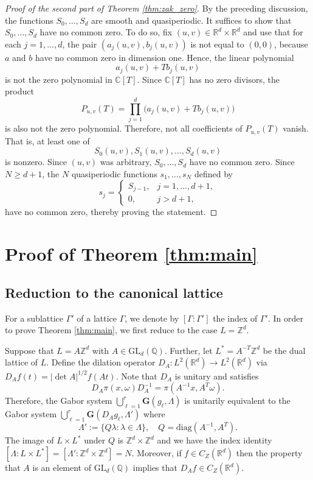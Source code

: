 \documentclass[reqno,a4paper,12pt]{amsart}
\numberwithin{equation}{section}
\def\Z{{\mathbb Z}}
\def\R{{\mathbb R}}
\def\Q{{\mathbb Q}}
\newcommand{\Rd}{{\R^d}}
\newcommand{\ltd}{{L^2(\R^d)}}
\newcommand\1{\mathds{1}}
\begin{document}
\begin{proof}[Proof of the second part of Theorem \ref{thm:zak_zero}]

By the preceding discussion, the functions $S_0, \dots, S_d$ are smooth and quasiperiodic. It suffices to show that $
S_0,\dots,S_d
$
have no common zero. To do so, fix
$
(u,v)\in\mathbb R^d\times\mathbb R^d
$
and use that for each $j=1,\dots,d$, the pair
$
(a_j(u,v),b_j(u,v))
$
is not equal to $(0,0)$, because $a$ and $b$ have no common zero in
dimension one.
Hence, the linear polynomial
$$
a_j(u,v)+T b_j(u,v)
$$
is not the zero polynomial in $\mathbb C[T]$. Since $\mathbb C[T]$ has no
zero divisors, the product
$$
P_{u,v}(T)
=
\prod_{j=1}^d
\bigl(a_j(u,v)+T b_j(u,v)\bigr)
$$
is also not the zero polynomial.
Therefore, not all coefficients of $P_{u,v}(T)$ vanish. That is, at least one
of
$$
S_0(u,v),S_1(u,v),\dots,S_d(u,v)
$$
is nonzero. Since $(u,v)$ was arbitrary, $S_0,\dots,S_d$ have no common zero. Since $N \geq d+1$, the $N$ quasiperiodic functions $s_1, \dots, s_N$ defined by
\begin{equation}
    s_j = \begin{cases}
        S_{j-1}, & j = 1,\dots, d+1, \\
        0, & j > d+1,
    \end{cases}
\end{equation}
have no common zero, thereby proving the statement.
\end{proof}


\section{Proof of Theorem \ref{thm:main}}

\subsection{Reduction to the canonical lattice}\label{sec:reduction}
For a sublattice $\Gamma'$ of a lattice $\Gamma$, we denote by $[\Gamma:\Gamma']$ the index of $\Gamma'$. In order to prove Theorem \ref{thm:main}, we first reduce to the case $L=\Z^d$.

Suppose that $L=A\Z^d$ with $A \in \mathrm{GL}_d(\Q)$.
Further, let $L^*=A^{-T}\mathbb Z^d$ be the dual lattice of $L$. Define the dilation operator $D_A : \ltd \to \ltd$ via
$
D_A f(t)=|\det A|^{1/2}f(At).
$
Note that $D_A$ is unitary and satisfies
$$
D_A\pi(x,\omega)D_A^{-1}
=
\pi(A^{-1}x,A^T\omega).
$$
Therefore, the Gabor system $\bigcup_{\ell=1}^r \mathbf G(g_\ell,\Lambda)$ is unitarily equivalent to the Gabor system $\bigcup_{\ell=1}^r \mathbf G(D_A g_\ell,\Lambda')$ where
$$
\Lambda'
:=
\{Q\lambda:\lambda\in\Lambda\}, \quad Q = \mathrm{diag}(A^{-1},A^T).
$$
The image of $L\times L^*$ under $Q$ is $\Z^d\times\mathbb Z^d$ and we have the index identity
$
[\Lambda:L\times L^*]=[\Lambda':\mathbb Z^d\times\mathbb Z^d]=N.
$
Moreover, if $f \in C_Z(\Rd)$ then the property that $A$ is an element of $\mathrm{GL}_d(\Q)$ implies that $D_Af \in C_Z(\Rd)$.
\end{document}

